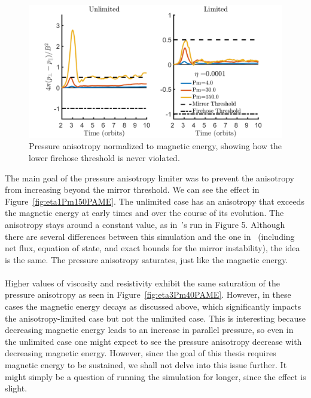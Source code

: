 \begin{figure}[h]
  \begin{center}  
    \includegraphics[width=\textwidth, angle=0.]{img/eta1-Pm4-30-150-PA.png}
  \end{center}
  \caption{Pressure anisotropy normalized to magnetic energy, showing how the lower firehose threshold is never violated.}
  \label{fig:eta1PAME}
\end{figure}
%
%
The main goal of the pressure anisotropy limiter was to prevent the anisotropy from increasing beyond the mirror threshold. We can see the effect in Figure~\ref{fig:eta1Pm150PAME}. The unlimited case has an anisotropy that exceeds the magnetic energy at early times and over the course of its evolution. The anisotropy stays around a constant value, as in~'s run in Figure 5. Although there are several differences between this simulation and the one in~ (including net flux, equation of state, and exact bounds for the mirror instability), the idea is the same. The pressure anisotropy saturates, just like the magnetic energy. \\
\\
Higher values of viscosity and resistivity exhibit the same saturation of the pressure anisotropy as seen in Figure~\ref{fig:eta3Pm40PAME}. However, in these cases the magnetic energy decays as discussed above, which significantly impacts the anisotropy-limited case but not the unlimited case. This is interesting because decreasing magnetic energy leads to an increase in parallel pressure, so even in the unlimited case one might expect to see the pressure anisotropy decrease with decreasing magnetic energy. However, since the goal of this thesis requires magnetic energy to be sustained, we shall not delve into this issue further. It might simply be a question of running the simulation for longer, since the effect is slight.\\
